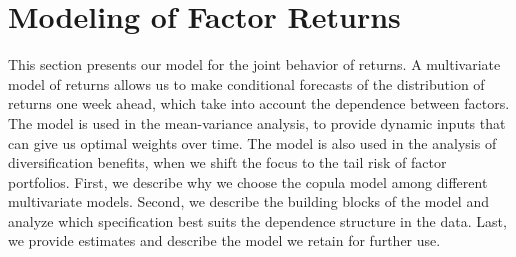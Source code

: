 
\section{Modeling of Factor Returns} %
\label{sec:modeling_of_factor_returns}

This section presents our model for the joint behavior of returns. A multivariate model of returns allows us to make conditional forecasts of the distribution of returns one week ahead, which take into account the dependence between factors. The model is used in the mean-variance analysis, to provide dynamic inputs that can give us optimal weights over time. The model is also used in the analysis of diversification benefits, when we shift the focus to the tail risk of factor portfolios. First, we describe why we choose the copula model among different multivariate models. Second, we describe the building blocks of the model and analyze which specification best suits the dependence structure in the data. Last, we provide estimates and describe the model we retain for further use.








